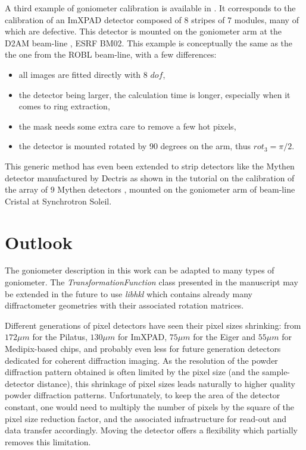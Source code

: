 \documentclass[preprint]{iucr}              %
\begin{document}
A third example of goniometer calibration is available in \cite{rotation_xpad}. 
It corresponds to the calibration of an ImXPAD detector \cite{BOUDET200341}
composed of 8 stripes of 7 modules, many of which are defective.
This detector is mounted on the goniometer arm at the D2AM beam-line
\cite{Ferrer:ri0008}, ESRF BM02. 
This example is conceptually the same as the the one from the ROBL beam-line,
with a few differences:
\begin{itemize}
  \item all images are fitted directly with 8 $dof$,
  \item the detector being larger, the calculation time is
        longer, especially when it comes to ring extraction,
  \item the mask needs some extra care to remove a few hot pixels,
  \item the detector is mounted rotated by 90 degrees on the arm, thus $rot_3=\pi/2$.
\end{itemize}

This generic method has even been extended to strip detectors 
like the Mythen detector manufactured by Dectris as shown in the tutorial on the 
calibration of the array of 9 Mythen detectors \cite{rotation_mythen}, mounted on 
the goniometer arm of beam-line Cristal at Synchrotron Soleil.  

\section{Outlook}

The goniometer description in this work can be adapted to
many types of goniometer.
The \textit{TransformationFunction} class presented in the manuscript may be extended
in the future to use \textit{libhkl} \cite{libhkl} which contains already many
diffractometer geometries with their associated rotation matrices. 

Different generations of pixel detectors have seen their pixel sizes
shrinking:
from $172 \mu m$ for the Pilatus, $130 \mu m$ for ImXPAD, $75 \mu m$ for the
Eiger and $55 \mu m$ for Medipix-based chips, and probably even less for
future generation detectors dedicated for coherent diffraction imaging.
As the resolution of the powder diffraction pattern obtained is often limited by the
pixel size (and the sample-detector distance), this shrinkage of
pixel sizes leads naturally to higher quality powder
diffraction patterns.
Unfortunately, to keep the area of the detector constant, one would need
to multiply the number of pixels by the square of the pixel size reduction
factor, and the associated infrastructure for read-out and data transfer
accordingly.
Moving the detector offers a flexibility which partially removes this
limitation.
\end{document}
